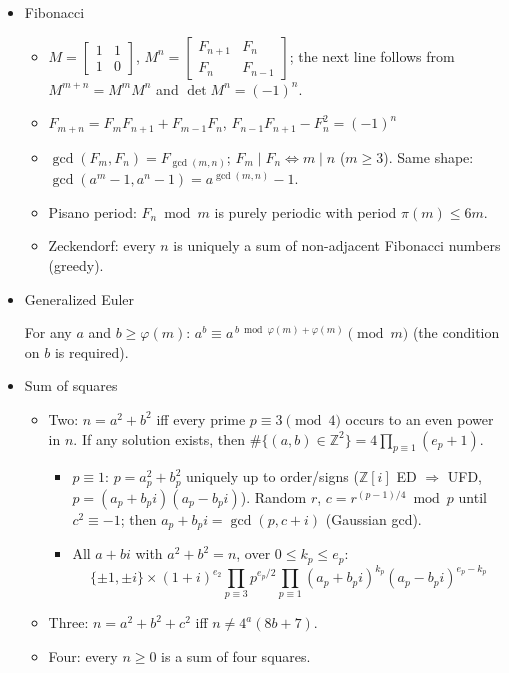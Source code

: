 \begin{itemize}
\item Fibonacci

\begin{itemize}
  \item $M = \begin{bmatrix}1&1\\1&0\end{bmatrix}$, $M^n = \begin{bmatrix}F_{n+1}&F_n\\F_n&F_{n-1}\end{bmatrix}$; the next line follows from $M^{m+n} = M^m M^n$ and $\det M^n = (-1)^n$.
  \item $F_{m+n} = F_m F_{n+1} + F_{m-1} F_n$, \quad $F_{n-1}F_{n+1} - F_n^2 = (-1)^n$
  \item $\gcd(F_m, F_n) = F_{\gcd(m,n)}$; $F_m \mid F_n \iff m \mid n$ ($m \ge 3$). Same shape: $\gcd(a^m - 1, a^n - 1) = a^{\gcd(m,n)} - 1$.
  \item Pisano period: $F_n \bmod m$ is purely periodic with period $\pi(m) \le 6m$.
  \item Zeckendorf: every $n$ is uniquely a sum of non-adjacent Fibonacci numbers (greedy).
\end{itemize}

\item Generalized Euler

For any $a$ and $b \ge \varphi(m)$: $a^b \equiv a^{\,b \bmod \varphi(m) + \varphi(m)} \pmod m$ (the condition on $b$ is required).

\item Sum of squares

\begin{itemize}
  \item Two: $n = a^2 + b^2$ iff every prime $p \equiv 3 \pmod 4$ occurs to an even power in $n$. If any solution exists, then $\#\{(a,b) \in \mathbb{Z}^2\} = 4\prod_{p \equiv 1}(e_p + 1)$.
  \begin{itemize}
    \item $p \equiv 1$: $p = a_p^2 + b_p^2$ uniquely up to order/signs ($\mathbb{Z}[i]$ ED $\Rightarrow$ UFD, $p = (a_p+b_pi)(a_p-b_pi)$).
      Random $r$, $c = r^{(p-1)/4} \bmod p$ until $c^2 \equiv -1$; then $a_p+b_pi = \gcd(p, c+i)$ (Gaussian gcd).
    \item All $a+bi$ with $a^2+b^2=n$, over $0 \le k_p \le e_p$:
      \[\{\pm 1, \pm i\} \times (1+i)^{e_2}\prod_{p \equiv 3} p^{e_p/2}\prod_{p \equiv 1}(a_p+b_pi)^{k_p}(a_p-b_pi)^{e_p-k_p}\]
  \end{itemize}
  \item Three: $n = a^2 + b^2 + c^2$ iff $n \ne 4^a(8b + 7)$.
  \item Four: every $n \ge 0$ is a sum of four squares.
\end{itemize}


\end{itemize}
